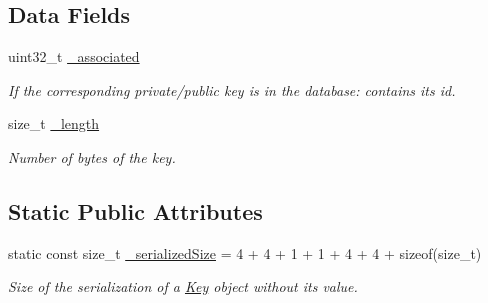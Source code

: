 \subsection*{Data Fields}
\begin{DoxyCompactItemize}
\item 
\hypertarget{classKey_ae1446a9d9b71136f028dc1409c34bebb}{}uint32\+\_\+t \hyperlink{classKey_ae1446a9d9b71136f028dc1409c34bebb}{\+\_\+associated}\label{classKey_ae1446a9d9b71136f028dc1409c34bebb}

\begin{DoxyCompactList}\small\item\em If the corresponding private/public key is in the database\+: contains its id. \end{DoxyCompactList}\item 
\hypertarget{classKey_a4e3025fda6f980edcece0758a8e94eef}{}size\+\_\+t \hyperlink{classKey_a4e3025fda6f980edcece0758a8e94eef}{\+\_\+length}\label{classKey_a4e3025fda6f980edcece0758a8e94eef}

\begin{DoxyCompactList}\small\item\em Number of bytes of the key. \end{DoxyCompactList}\end{DoxyCompactItemize}
\subsection*{Static Public Attributes}
\begin{DoxyCompactItemize}
\item 
\hypertarget{classKey_a95681409ecb459f2972bb68d0d0a0e26}{}static const size\+\_\+t \hyperlink{classKey_a95681409ecb459f2972bb68d0d0a0e26}{\+\_\+serialized\+Size} = 4 + 4 + 1 + 1 + 4 + 4 + sizeof(size\+\_\+t)\label{classKey_a95681409ecb459f2972bb68d0d0a0e26}

\begin{DoxyCompactList}\small\item\em Size of the serialization of a \hyperlink{classKey}{Key} object without its value. \end{DoxyCompactList}\end{DoxyCompactItemize}
